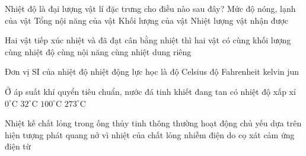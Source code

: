 
\begin{ex}
Nhiệt độ là đại lượng vật lí đặc trưng cho điều nào sau đây?
\choice
{\True Mức độ nóng, lạnh của vật}
{Tổng nội năng của vật}
{Khối lượng của vật}
{Nhiệt lượng vật nhận được}
\end{ex}

\begin{ex}
Hai vật tiếp xúc nhiệt và đã đạt cân bằng nhiệt thì hai vật có
\choice
{cùng khối lượng}
{\True cùng nhiệt độ}
{cùng nội năng}
{cùng nhiệt dung riêng}
\end{ex}

\begin{ex}
Đơn vị SI của nhiệt độ nhiệt động lực học là
\choice
{độ Celsius}
{độ Fahrenheit}
{\True kelvin}
{jun}
\end{ex}

\begin{ex}
Ở áp suất khí quyển tiêu chuẩn, nước đá tinh khiết đang tan có nhiệt độ xấp xỉ
\choice
{\True $0^\circ\mathrm{C}$}
{$32^\circ\mathrm{C}$}
{$100^\circ\mathrm{C}$}
{$273^\circ\mathrm{C}$}
\end{ex}

\begin{ex}
Nhiệt kế chất lỏng trong ống thủy tinh thông thường hoạt động chủ yếu dựa trên hiện tượng
\choice
{phát quang}
{\True nở vì nhiệt của chất lỏng}
{nhiễm điện do cọ xát}
{cảm ứng điện từ}
\end{ex}

